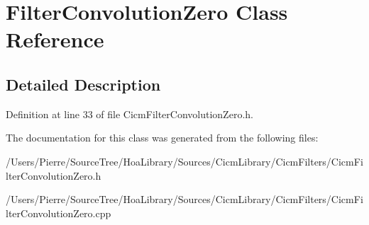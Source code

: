 \hypertarget{class_filter_convolution_zero}{\section{Filter\-Convolution\-Zero Class Reference}
\label{class_filter_convolution_zero}
}


\subsection{Detailed Description}


Definition at line 33 of file Cicm\-Filter\-Convolution\-Zero.\-h.



The documentation for this class was generated from the following files\-:\begin{DoxyCompactItemize}
\item 
/\-Users/\-Pierre/\-Source\-Tree/\-Hoa\-Library/\-Sources/\-Cicm\-Library/\-Cicm\-Filters/Cicm\-Filter\-Convolution\-Zero.\-h\item 
/\-Users/\-Pierre/\-Source\-Tree/\-Hoa\-Library/\-Sources/\-Cicm\-Library/\-Cicm\-Filters/Cicm\-Filter\-Convolution\-Zero.\-cpp\end{DoxyCompactItemize}
